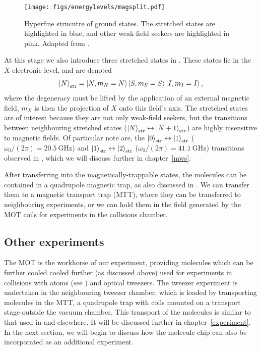 \begin{figure}
  \centering
  \texttt{[image: figs/energylevels/magsplit.pdf]}
  \caption{Hyperfine strucutre of \CaF{} ground states. The stretched states
    are highlighted in blue, and other weak-field seekers are highlighted in
    pink. Adapted from .}
  \label{overview:fig:magtrapstates}
\end{figure}


At this stage we also introduce three stretched states in \CaF{}. These states
lie in the $X$ electronic level, and are denoted
%
\begin{equation}
  \ket{N}_\text{str} = \ket{N, m_N=N}\ket{S, m_S=S}\ket{I,m_I=I},
\end{equation}
%
where the degeneracy must be lifted by the application of an external magnetic
field, $m_X$ is then the projection of $X$ onto this field's axis. The
stretched states are of interest because they are not only weak-field seekers,
but the transitions between neighbouring stretched states
($\ket{N}_\text{str}\leftrightarrow\ket{N+1}_\text{str}$) are highly
insensitive to magnetic fields. Of particular note are, the
$\ket{0}_\text{str}\leftrightarrow\ket{1}_\text{str}$ ($\omega_0/(2\pi) =
\SI{20.5}{\giga\hertz}$) and
$\ket{1}_\text{str}\leftrightarrow\ket{2}_\text{str}$ ($\omega_0/(2\pi) =
\SI{41.1}{\giga\hertz}$) transitions observed in
, which we will discuss further in
chapter~\ref{mws}.

After transferring into the magnetically-trappable states, the molecules can be
contained in a quadrupole magnetic trap, as also discussed in
. We can transfer them to a magnetic transport
trap (MTT), where they can be transferred to neighbouring experiments, or we
can hold them in the field generated by the MOT coils for experiments in the
collisions chamber.

\subsection{Other experiments}

The \CaF{} MOT is the workhorse of our experiment, providing molecules which
can be further cooled cooled further (as discussed above) used for experiments
in collisions with \Rb{} atoms (see ) and optical tweezers. The tweezer experiment is
undertaken in the neighbouring tweezer chamber, which is loaded by transporting
molecules in the MTT, a quadrupole trap with coils mounted on a transport stage
outside the vacuum chamber. This transport of the molecules is similar to that
used in  and elsewhere. It
will be discussed further in chapter~\ref{experiment}. In the next section, we
will begin to discuss how the molecule chip can also be incorporated as an
additional experiment.


